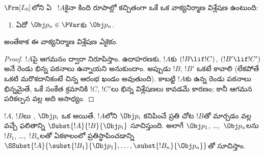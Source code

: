 \documentclass[../../../include/open-logic-section]{subfiles}
\begin{document}
\begin{prop}[ఏకైక పఠనీయత]
$ \Frm[L_0]$లోని ఏ ~$!A$కైనా కింది రూపాల్లో కచ్చితంగా
ఒకే ఒక వాక్యనిర్మాణ విశ్లేషణ ఉంటుంది:
\begin{enumerate}


\item ఏదో $\Obj p_n \in  \PVar$కు $\Obj p_n$.





\end{enumerate}
అంతేకాక ఈ వాక్యనిర్మాణ విశ్లేషణ \emph{ఏకైకం}.
\end{prop}

\begin{proof}
$!A$పై ఆగమనం ద్వారా నిరూపిస్తాం. ఉదాహరణకు, $!A$కు
$(!B \lif !C)$, $(!B' \lif !C')$ అనే రెండు భిన్న పఠనాలు ఉన్నాయని
అనుకుందాం. అప్పుడు $!B$, $!B'$ ఒకటే కావాలి (లేకపోతే ఒకటి మరొకదానికంటే చిన్న
ఆరంభ ఖండం అవుతుంది). కాబట్టి $!A$కు ఉన్న రెండు పఠనాలు భిన్నమైతే,
ఒకే సంకేత క్రమానికి $!C$, $!C'$లు భిన్న విశ్లేషణలు కావడమే కారణం; కానీ
ఆగమన పరికల్పన వల్ల అది అసాధ్యం.
\end{proof}


\begin{defn}[ఏకరీతి ప్రతిస్థాపన]
$!A$, $!B$లు , $\Obj p_i$ ఒక  అయితే, $!A$లోని $\Obj p_i$ కనిపించే ప్రతి చోట $!B$తో
మార్చడం వల్ల వచ్చే ఫలితాన్ని $\Subst{!A}{!B}{\Obj p_i}$ సూచిస్తుంది.
అలాగే $\Obj p_1$, \dots,~$\Obj p_n$లను  $!B_1$,
\dots,~$!B_n$లతో ఏకకాలంలో ప్రతిస్థాపించడాన్ని
$\SSubst{!A}{\subst{!B_1}{\Obj p_1},\dots,\subst{!B_n}{\Obj p_n}}$తో
సూచిస్తాం.
\end{defn}
\end{document}
